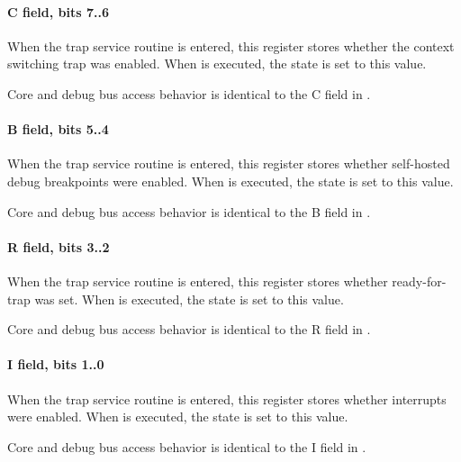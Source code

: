 \paragraph*{C field, bits 7..6}
When the trap service routine is entered, this register stores whether the
context switching trap was enabled. When  is executed, the state is
set to this value.

Core and debug bus access behavior is identical to the C field in .
\paragraph*{B field, bits 5..4}
When the trap service routine is entered, this register stores whether
self-hosted debug breakpoints were enabled. When  is executed, the
state is set to this value.

Core and debug bus access behavior is identical to the B field in .
\paragraph*{R field, bits 3..2}
When the trap service routine is entered, this register stores whether
ready-for-trap was set. When  is executed, the state is set to this
value.

Core and debug bus access behavior is identical to the R field in .
\paragraph*{I field, bits 1..0}
When the trap service routine is entered, this register stores whether
interrupts were enabled. When  is executed, the state is set to this
value.

Core and debug bus access behavior is identical to the I field in .
